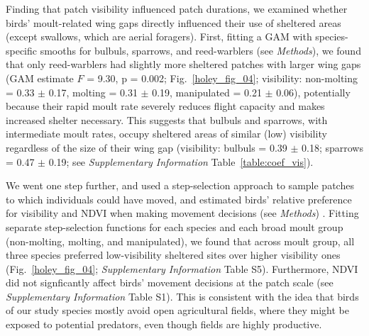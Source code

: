 Finding that patch visibility influenced patch durations, we examined whether birds' moult-related wing gaps directly influenced their use of sheltered areas (except swallows, which are aerial foragers).
First, fitting a GAM with species-specific smooths for bulbuls, sparrows, and reed-warblers (see \textit{Methods}), we found that only reed-warblers had slightly more sheltered patches with larger wing gaps (GAM estimate $F$ = 9.30, p = 0.002; Fig.~\ref{holey_fig_04}; visibility: non-molting = 0.33 $\pm$ 0.17, molting = 0.31 $\pm$ 0.19, manipulated = 0.21 $\pm$ 0.06), potentially because their rapid moult rate severely reduces flight capacity and makes increased shelter necessary.
This suggests that bulbuls and sparrows, with intermediate moult rates, occupy sheltered areas of similar (low) visibility regardless of the size of their wing gap (visibility: bulbuls =  0.39 $\pm$ 0.18; sparrows = 0.47 $\pm$ 0.19; see \textit{Supplementary Information} Table~\ref{table:coef_vis}).

We went one step further, and used a step-selection approach to sample patches to which individuals could have moved, and estimated birds' relative preference for visibility and NDVI when making movement decisions (see \textit{Methods}) \citep{avgar2016,aben2021}.
Fitting separate step-selection functions for each species and each broad moult group (non-molting, molting, and manipulated), we found that across moult group, all three species preferred low-visibility sheltered sites over higher visibility ones (Fig.~\ref{holey_fig_04}; \textit{Supplementary Information} Table S5).
Furthermore, NDVI did not signficantly affect birds' movement decisions at the patch scale (see \textit{Supplementary Information} Table {S1}).
This is consistent with the idea that birds of our study species mostly avoid open agricultural fields, where they might be exposed to potential predators, even though fields are highly productive.

